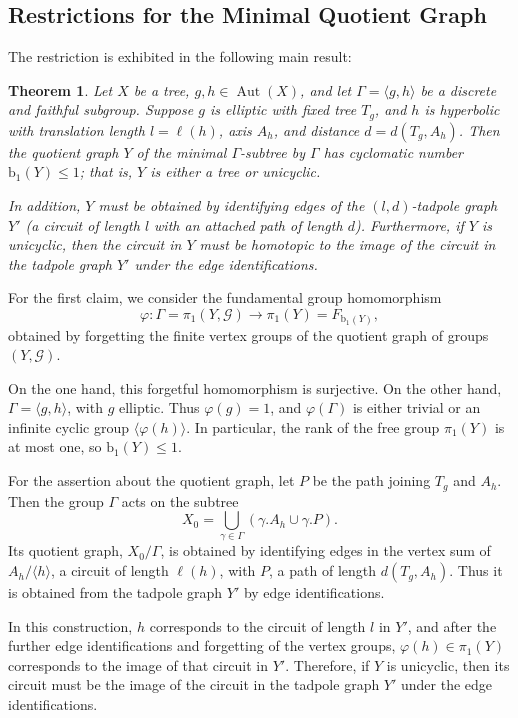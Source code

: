 \documentclass[12pt,leqno]{amsart}
\makeatletter
\renewenvironment{proof}[1][\proofname]{%
	\par
	\pushQED{\qed}%
	\normalfont
	\topsep6\p@\@plus6\p@\relax
	\trivlist
	\item[\hskip\labelsep\itshape #1\@addpunct{.}]%
	\ignorespaces
}{%
	\par\nobreak\vspace{2pt}%
	\popQED%
	\medskip%
	\endtrivlist
	\@endpefalse
}
\newcommand{\2}{L^2_{\rm per}(0, T)}
\newtheorem{thm}{Theorem}[section]
\newcommand{\aut}{{\operatorname{Aut}}}
\numberwithin{equation}{section}
\numberwithin{figure}{section}
\makeatother
\begin{document}
\subsection{Restrictions for the Minimal Quotient Graph}
The restriction is exhibited in the following main result:
\begin{thm}\label{prop:ellip_gog}
    Let $X$ be a tree, $g,h\in\aut(X)$, and let $\Gamma = \langle g,h\rangle$ be a discrete and faithful subgroup. Suppose $g$ is elliptic with fixed tree $T_g$, and $h$ is hyperbolic with translation length $l = \ell(h)$, axis $A_h$, and distance $d = d(T_g,A_h)$. Then the quotient graph $Y$ of the minimal $\Gamma$-subtree by $\Gamma$ has cyclomatic number $\mathrm{b}_1(Y)\leq 1$; that is, $Y$ is either a tree or unicyclic.

    In addition, $Y$ must be obtained by identifying edges of the $(l,d)$-tadpole graph $Y'$ (a circuit of length $l$ with an attached path of length $d$). Furthermore, if $Y$ is unicyclic, then the circuit in $Y$ must be homotopic to the image of the circuit in the tadpole graph $Y'$ under the edge identifications.
\end{thm}
\begin{proof}
    For the first claim, we consider the fundamental group homomorphism
    \[
    \varphi: \Gamma = \pi_1(Y,\mathcal{G})\to \pi_1(Y) = F_{\mathrm{b}_1(Y)},
    \]
    obtained by forgetting the finite vertex groups of the quotient graph of groups $(Y,\mathcal{G})$. 
   
    On the one hand, this forgetful homomorphism is surjective. On the other hand, $\Gamma = \langle g,h\rangle$, with $g$ elliptic. Thus $\varphi(g) = 1$, and $\varphi(\Gamma)$ is either trivial or an infinite cyclic group $\langle \varphi(h)\rangle$. In particular, the rank of the free group $\pi_1(Y)$ is at most one, so $\mathrm{b}_1(Y)\leq 1$.

    For the assertion about the quotient graph, let $P$ be the path joining $T_g$ and $A_h$. Then the group $\Gamma$ acts on the subtree
    \[
    X_0 = \bigcup_{\gamma\in\Gamma}(\gamma.A_h\cup \gamma.P).
    \]
    Its quotient graph, $X_0/\Gamma$, is obtained by identifying edges in the vertex sum of $A_h/\langle h\rangle$, a circuit of length $\ell(h)$, with $P$, a path of length $d(T_g,A_h)$. Thus it is obtained from the tadpole graph $Y'$ by edge identifications.
    
    In this construction, $h$ corresponds to the circuit of length $l$ in $Y'$, and after the further edge identifications and forgetting of the vertex groups, $\varphi(h)\in\pi_1(Y)$ corresponds to the image of that circuit in $Y'$. Therefore, if $Y$ is unicyclic, then its circuit must be the image of the circuit in the tadpole graph $Y'$ under the edge identifications.
\end{proof}
\end{document}
